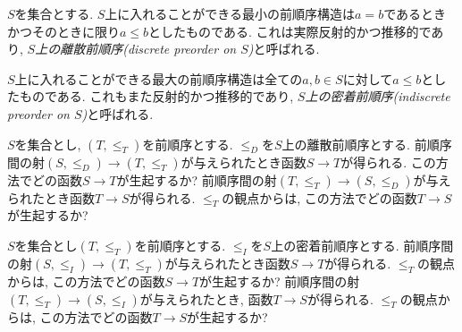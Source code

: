 \begin{example}\label{ex:discrete and indiscrete}


$S$を集合とする. $S$上に入れることができる最小の前順序構造は$a=b$であるときかつそのときに限り$a\leq b$としたものである. これは実際反射的かつ推移的であり, \emph{$S$上の離散前順序(discrete preorder on $S$)}と呼ばれる.


$S$上に入れることができる最大の前順序構造は全ての$a,b\in S$に対して$a\leq b$としたものである. これもまた反射的かつ推移的であり, \emph{$S$上の密着前順序(indiscrete preorder on $S$)}と呼ばれる.

\end{example}

\begin{exercise}
$S$を集合とし, $(T,\leq_T)$を前順序とする. $\leq_D$を$S$上の離散前順序とする. 前順序間の射$(S,\leq_D)\to (T,\leq_T)$が与えられたとき函数$S\to T$が得られる.
\sexc この方法でどの函数$S\to T$が生起するか?
\next 前順序間の射$(T,\leq_T)\to(S,\leq_D)$が与えられたとき函数$T\to S$が得られる. $\leq_T$の観点からは, この方法でどの函数$T\to S$が生起するか?
\endsexc
\end{exercise}

\begin{exercise}
$S$を集合とし$(T,\leq_T)$を前順序とする. $\leq_I$を$S$上の密着前順序とする. 前順序間の射$(S,\leq_I)\to (T,\leq_T)$が与えられたとき函数$S\to T$が得られる.
\sexc $\leq_T$の観点からは, この方法でどの函数$S\to T$が生起するか?
\next 前順序間の射$(T,\leq_T)\to(S,\leq_I)$が与えられたとき, 函数$T\to S$が得られる. $\leq_T$の観点からは, この方法でどの函数$T\to S$が生起するか?
\endsexc
\end{exercise}

